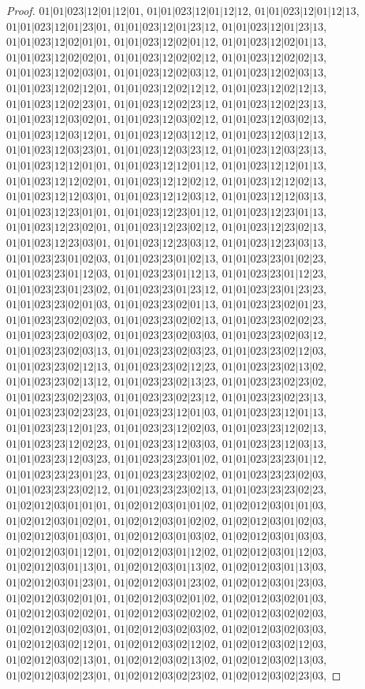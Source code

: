 \documentclass[12pt]{article}
\theoremstyle{plain}
\theoremstyle{definition}
\theoremstyle{remark}
\begin{document}
\begin{proof}
$01|01|023|12|01|12|01$, $01|01|023|12|01|12|12$, $01|01|023|12|01|12|13$, $01|01|023|12|01|23|01$, $01|01|023|12|01|23|12$, $01|01|023|12|01|23|13$, $01|01|023|12|02|01|01$, $01|01|023|12|02|01|12$, $01|01|023|12|02|01|13$, $01|01|023|12|02|02|01$, $01|01|023|12|02|02|12$, $01|01|023|12|02|02|13$, $01|01|023|12|02|03|01$, $01|01|023|12|02|03|12$, $01|01|023|12|02|03|13$, $01|01|023|12|02|12|01$, $01|01|023|12|02|12|12$, $01|01|023|12|02|12|13$, $01|01|023|12|02|23|01$, $01|01|023|12|02|23|12$, $01|01|023|12|02|23|13$, $01|01|023|12|03|02|01$, $01|01|023|12|03|02|12$, $01|01|023|12|03|02|13$, $01|01|023|12|03|12|01$, $01|01|023|12|03|12|12$, $01|01|023|12|03|12|13$, $01|01|023|12|03|23|01$, $01|01|023|12|03|23|12$, $01|01|023|12|03|23|13$, $01|01|023|12|12|01|01$, $01|01|023|12|12|01|12$, $01|01|023|12|12|01|13$, $01|01|023|12|12|02|01$, $01|01|023|12|12|02|12$, $01|01|023|12|12|02|13$, $01|01|023|12|12|03|01$, $01|01|023|12|12|03|12$, $01|01|023|12|12|03|13$, $01|01|023|12|23|01|01$, $01|01|023|12|23|01|12$, $01|01|023|12|23|01|13$, $01|01|023|12|23|02|01$, $01|01|023|12|23|02|12$, $01|01|023|12|23|02|13$, $01|01|023|12|23|03|01$, $01|01|023|12|23|03|12$, $01|01|023|12|23|03|13$, $01|01|023|23|01|02|03$, $01|01|023|23|01|02|13$, $01|01|023|23|01|02|23$, $01|01|023|23|01|12|03$, $01|01|023|23|01|12|13$, $01|01|023|23|01|12|23$, $01|01|023|23|01|23|02$, $01|01|023|23|01|23|12$, $01|01|023|23|01|23|23$, $01|01|023|23|02|01|03$, $01|01|023|23|02|01|13$, $01|01|023|23|02|01|23$, $01|01|023|23|02|02|03$, $01|01|023|23|02|02|13$, $01|01|023|23|02|02|23$, $01|01|023|23|02|03|02$, $01|01|023|23|02|03|03$, $01|01|023|23|02|03|12$, $01|01|023|23|02|03|13$, $01|01|023|23|02|03|23$, $01|01|023|23|02|12|03$, $01|01|023|23|02|12|13$, $01|01|023|23|02|12|23$, $01|01|023|23|02|13|02$, $01|01|023|23|02|13|12$, $01|01|023|23|02|13|23$, $01|01|023|23|02|23|02$, $01|01|023|23|02|23|03$, $01|01|023|23|02|23|12$, $01|01|023|23|02|23|13$, $01|01|023|23|02|23|23$, $01|01|023|23|12|01|03$, $01|01|023|23|12|01|13$, $01|01|023|23|12|01|23$, $01|01|023|23|12|02|03$, $01|01|023|23|12|02|13$, $01|01|023|23|12|02|23$, $01|01|023|23|12|03|03$, $01|01|023|23|12|03|13$, $01|01|023|23|12|03|23$, $01|01|023|23|23|01|02$, $01|01|023|23|23|01|12$, $01|01|023|23|23|01|23$, $01|01|023|23|23|02|02$, $01|01|023|23|23|02|03$, $01|01|023|23|23|02|12$, $01|01|023|23|23|02|13$, $01|01|023|23|23|02|23$, $01|02|012|03|01|01|01$, $01|02|012|03|01|01|02$, $01|02|012|03|01|01|03$, $01|02|012|03|01|02|01$, $01|02|012|03|01|02|02$, $01|02|012|03|01|02|03$, $01|02|012|03|01|03|01$, $01|02|012|03|01|03|02$, $01|02|012|03|01|03|03$, $01|02|012|03|01|12|01$, $01|02|012|03|01|12|02$, $01|02|012|03|01|12|03$, $01|02|012|03|01|13|01$, $01|02|012|03|01|13|02$, $01|02|012|03|01|13|03$, $01|02|012|03|01|23|01$, $01|02|012|03|01|23|02$, $01|02|012|03|01|23|03$, $01|02|012|03|02|01|01$, $01|02|012|03|02|01|02$, $01|02|012|03|02|01|03$, $01|02|012|03|02|02|01$, $01|02|012|03|02|02|02$, $01|02|012|03|02|02|03$, $01|02|012|03|02|03|01$, $01|02|012|03|02|03|02$, $01|02|012|03|02|03|03$, $01|02|012|03|02|12|01$, $01|02|012|03|02|12|02$, $01|02|012|03|02|12|03$, $01|02|012|03|02|13|01$, $01|02|012|03|02|13|02$, $01|02|012|03|02|13|03$, $01|02|012|03|02|23|01$, $01|02|012|03|02|23|02$, $01|02|012|03|02|23|03$, 
\end{proof}
\end{document}
